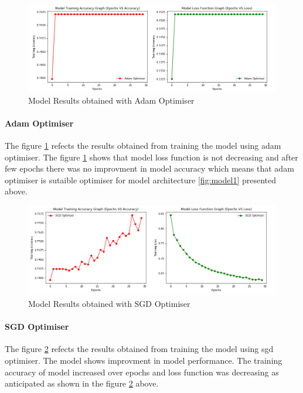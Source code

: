 \pagebreak

\begin{figure}[!htp]
    \centering
    \includegraphics[width=15cm]{Images/Adam Optimiser.png}
    \caption{Model Results obtained with Adam Optimiser}
    \label{fig:adam}
\end{figure}

\paragraph{Adam Optimiser}
The figure \ref{fig:adam} refects the results obtained from training the model using adam optimiser. The figure \ref{fig:adam} shows that model loss function 
is not decreasing and after few epochs there was no improvment in model accuracy which means that adam optimiser is sutaible 
optimiser for model architecture \ref{fig:model1} presented above.

\begin{figure}[!htp]
    \centering
    \includegraphics[width=15cm]{Images/SGD.png}
    \caption{Model Results obtained with SGD Optimiser}
    \label{fig:sgd}
\end{figure}

\paragraph{SGD Optimiser}
The figure \ref{fig:sgd} refects the results obtained from training the model using sgd optimiser. The model shows improvment in model 
performance. The training accuracy of model increased over epochs and loss function was decreasing as anticipated as shown in the figure 
\ref{fig:sgd} above.


